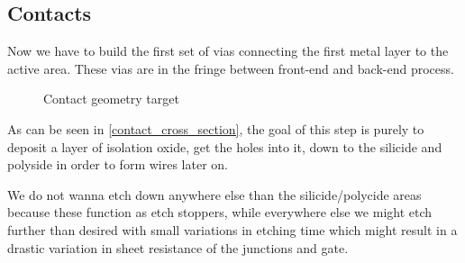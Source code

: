 \subsection{Contacts}\label{chapter_contact}

Now we have to build the first set of vias connecting the first metal layer to the active area.
These vias are in the fringe between front-end and back-end process.

\begin{figure}[H]
	\centering
	\begin{tikzpicture}[node distance = 3cm, auto, thick,scale=\CrossAndTopSectionBig, every node/.style={transform shape}]
		
	\end{tikzpicture}
	\caption{Contact geometry target}
	\label{contact_cross_section}
\end{figure}

As can be seen in \autoref{contact_cross_section}, the goal of this step is purely to deposit a layer of isolation oxide,
get the holes into it, down to the silicide and polyside in order to form wires later on.

We do not wanna etch down anywhere else than the silicide/polycide areas because these function as etch stoppers,
while everywhere else we might etch further than desired with small variations in etching time which might result
in a drastic variation in sheet resistance of the junctions and gate.
